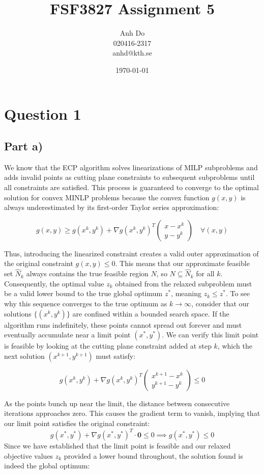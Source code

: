 \documentclass{article} %
\title{FSF3827 Assignment 5}
\author{Anh Do \\ 020416-2317 \\ anhd@kth.se}
\date{\today}
\begin{document}
\maketitle


\section*{Question 1}
    \subsection*{Part a)}
    We know that the ECP algorithm solves linearizations of MILP subproblems and adds invalid points as cutting plane constraints to subsequent subproblems until all constraints are satisfied. 
    This process is guaranteed to converge to the optimal solution for convex MINLP problems because the convex function $g(x,y)$ is always underestimated by its first-order Taylor series approximation:
    
    $$g(x,y) \geq g(x^k,y^k) + \nabla g(x^k,y^k)^T \begin{pmatrix} x - x^k \\
    y - y^k \end{pmatrix} \quad \forall (x,y)$$
    
    Thus, introducing the linearized constraint creates a valid outer approximation of the original constraint $g(x,y) \leq 0$. 
    This means that our approximate feasible set $\hat{N}_k$ always contains the true feasible region $N$, so $N \subseteq \hat{N}_k$ for all $k$. 
    Consequently, the optimal value $z_k$ obtained from the relaxed subproblem must be a valid lower bound to the true global optimum $z^*$, meaning $z_k \leq z^*$. 
    To see why this sequence converges to the true optimum as $k \to \infty$, consider that our solutions $\{(x^k, y^k)\}$ are confined within a bounded search space. 
    If the algorithm runs indefinitely, these points cannot spread out forever and must eventually accumulate near a limit point $(x^*, y^*)$. 
    We can verify this limit point is feasible by looking at the cutting plane constraint added at step $k$, which the next solution $(x^{k+1}, y^{k+1})$ must satisfy:
    
    $$g(x^k, y^k) + \nabla g(x^k, y^k)^T \begin{pmatrix} x^{k+1} - x^k \\
    y^{k+1} - y^k \end{pmatrix} \leq 0$$
    
    As the points bunch up near the limit, the distance between consecutive iterations approaches zero. 
    This causes the gradient term to vanish, implying that our limit point satisfies the original constraint:$$g(x^*, y^*) + \nabla g(x^*, y^*)^T \cdot \mathbf{0} \leq 0 \implies g(x^*, y^*) \leq 0$$
    Since we have established that the limit point is feasible and our relaxed objective values $z_k$ provided a lower bound throughout, the solution found is indeed the global optimum:
    
\end{document}
